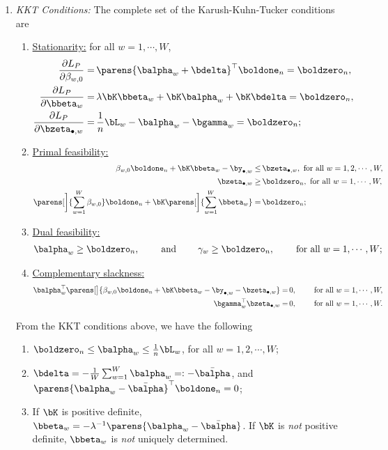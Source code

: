\documentclass[12pt]{article}
\begin{document}
\begin{enumerate}[label=\textbf{\arabic*.}]
\begin{enumerate}
		\item \textit{KKT Conditions:} The complete set of the Karush-Kuhn-Tucker conditions are 
		\begin{enumerate}
			\item \underline{Stationarity:} for all $w = 1, \cdots, W$, 
			\begin{align*}
				\frac{\partial L_P}{\partial \beta_{w,0}} = & \, \parens{\balpha_w + \bdelta}^\top \boldone_n = \boldzero_n, \\ 
				\frac{\partial L_P}{\partial \bbeta_{w}} = & \, \lambda \bK \bbeta_w + \bK \balpha_w + \bK \bdelta = \boldzero_n, \\ 
				\frac{\partial L_P}{\partial \bzeta_{\bullet, w}} = & \, \frac{1}{n} \bL_w - \balpha_w - \bgamma_w = \boldzero_n; 
			\end{align*}
			\item \underline{Primal feasibility:} 
			\begin{align*}
				\beta_{w,0} \boldone_{n} + \bK \bbeta_{w} - \by_{\bullet, w} \le & \, \bzeta_{\bullet, w}, \text{ for all } w = 1, 2, \cdots, W, \\
				\bzeta_{\bullet, w} \ge & \, \boldzero_{n}, \text{ for all } w = 1, \cdots, W, \\ 
				\parens[\bigg]{\sum_{w=1}^W \beta_{w,0} } \boldone_n + \bK \parens[\bigg]{\sum_{w=1}^W \bbeta_w} = & \, \boldzero_n; 
			\end{align*}
			\item \underline{Dual feasibility:} 
			\begin{align*}
				\balpha_{w} \ge \boldzero_n, \qquad \text{ and } \qquad \gamma_w \ge \boldzero_n, \qquad \text{ for all } w = 1, \cdots, W; 
			\end{align*}
			\item \underline{Complementary slackness:} 
			\begin{align*}
				\balpha_{w}^\top \parens[\big]{\beta_{w,0} \boldone_{n} + \bK \bbeta_{w} - \by_{\bullet, w} - \bzeta_{\bullet, w}} = & \, 0, \qquad \text{ for all } w = 1, \cdots, W, \\ 
				\bgamma_w^\top \bzeta_{\bullet,w} = & \, 0, \qquad \text{ for all } w = 1, \cdots, W. 
			\end{align*}
		\end{enumerate}
		From the KKT conditions above, we have the following 
		\begin{enumerate}
			\item $\boldzero_n \le \balpha_{w} \le \frac{1}{n} \bL_{w}$, for all $w = 1, 2, \cdots, W$; 
			\item $\bdelta = - \frac{1}{W} \sum_{w=1}^W \balpha_w =: -\bar{\balpha}$, and $\parens{\balpha_w - \bar{\balpha}}^\top \boldone_n = 0$; 
			\item If $\bK$ is positive definite, $\bbeta_w = -\lambda^{-1} \parens{\balpha_w - \bar{\balpha}}$. If $\bK$ is \emph{not} positive definite, $\bbeta_w$ is \emph{not} uniquely determined. 
		\end{enumerate}
		

\end{enumerate}
\end{enumerate}
\end{document}
